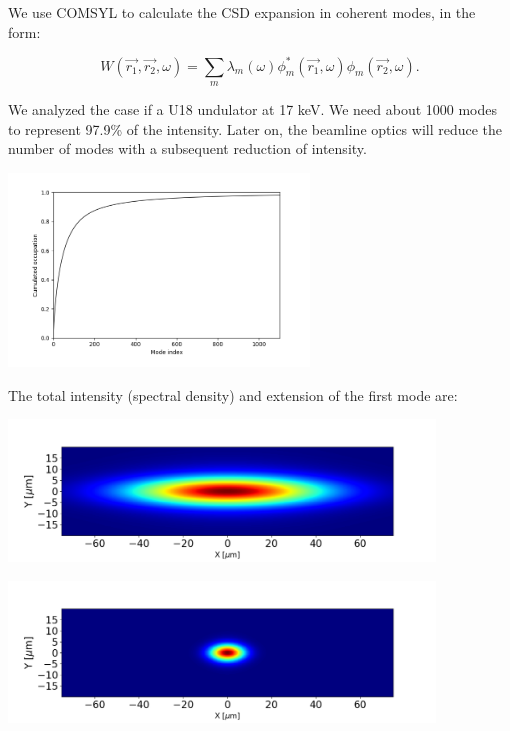 \documentclass[a4paper,10pt]{article}
\begin{document}
We use COMSYL to calculate the CSD expansion  in coherent modes, in the form:


\begin{equation}
W(\vec{r_1}, \vec{r_2}, \omega)
=
\sum_m
\lambda_m(\omega)
\phi_m^*(\vec{r_1},\omega)
\phi_m(\vec{r_2}, \omega).
\end{equation}

We analyzed the case if a U18 undulator at 17 keV. We need about 1000 modes to represent 97.9\% of the intensity. Later on, the beamline optics will reduce the number of modes  with a subsequent reduction of intensity. 

\includegraphics[width=0.6\textwidth]{Figures/vx_cumulated.png}

The total intensity (spectral density) and extension of the first mode are: 

\includegraphics[width=0.85\textwidth]{Figures/spectral_density_upto1099.png}


\includegraphics[width=0.85\textwidth]{Figures/spectral_density_upto0.png}
\end{document}
